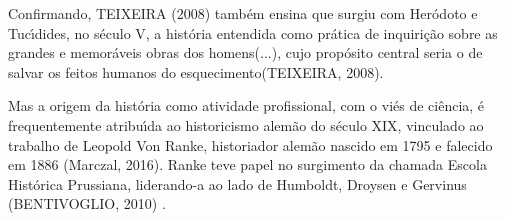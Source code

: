 \documentclass[
12pt,		%
openright,	%
twoside,  %
a4paper,			%
chapter=TITLE,		%
english,			%
french,				%
spanish,			%
brazil				%
]{USPSC-classe/USPSC_RedarTex}
\begin{document}
Confirmando, TEIXEIRA (2008)  tamb\'em ensina que surgiu com Her\'odoto e Tuc\'{\i}dides, no s\'eculo V, a hist\'oria \textquotedbl entendida como pr\'atica de inquiri\c{c}\~ao sobre as grandes e memor\'aveis obras dos homens(...), cujo prop\'osito central seria o de salvar os feitos humanos do esquecimento\textquotedbl   (TEIXEIRA, 2008).










Mas a origem da hist\'oria como atividade profissional, com o vi\'es de ci\^encia, \'e frequentemente atribu\'{\i}da ao historicismo alem\~ao do s\'eculo XIX, vinculado ao trabalho de Leopold Von Ranke, historiador alem\~ao nascido em 1795 e falecido em 1886 (Marczal, 2016). Ranke teve papel no surgimento da chamada Escola Hist\'orica Prussiana, liderando-a ao lado de Humboldt, Droysen e Gervinus  (BENTIVOGLIO, 2010) .
\end{document}
